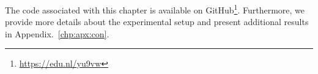 The code associated with this chapter is available on GitHub\footnote{\url{https://edu.nl/yu9vw}}.
Furthermore, we provide more details about the experimental setup and present additional results in Appendix.~\ref{chp:apx:con}.


